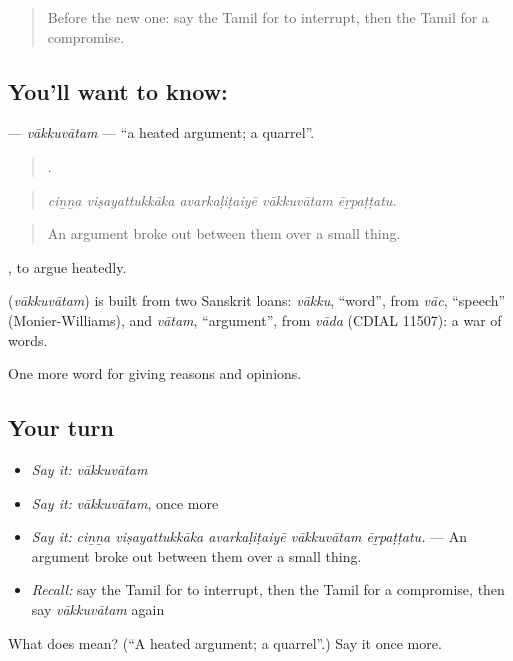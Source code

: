 \label{lesson:TA-C356-vakkuvatam}



\begin{quote}
Before the new one: say the Tamil for to interrupt, then the Tamil for a compromise.
\end{quote}

\subsection*{You'll want to know: }
\textbf{} — \emph{vākkuvātam} — \textquotedblleft{}a heated argument; a quarrel\textquotedblright{}.

\begin{quote}
    .
\end{quote}

\begin{quote}
\emph{ciṉṉa viṣayattukkāka avarkaḷiṭaiyē vākkuvātam ēṟpaṭṭatu.}
\end{quote}

\begin{quote}
An argument broke out between them over a small thing.
\end{quote}

 , to argue heatedly.

\begin{cousinweb}
\textbf{} (\emph{vākkuvātam}) is built from two Sanskrit loans: \emph{vākku}, \textquotedblleft{}word\textquotedblright{}, from \emph{vāc}, \textquotedblleft{}speech\textquotedblright{} (Monier-Williams), and \emph{vātam}, \textquotedblleft{}argument\textquotedblright{}, from \emph{vāda} (CDIAL 11507): a war of words.
\end{cousinweb}

\begin{grammarlens}[title={What you've built}]
One more word for giving reasons and opinions.
\end{grammarlens}

\subsection*{Your turn}
\begin{itemize}
\raggedright
  \item \emph{Say it:} \emph{vākkuvātam}
  \item \emph{Say it:} \emph{vākkuvātam}, once more
  \item \emph{Say it:} \emph{ciṉṉa viṣayattukkāka avarkaḷiṭaiyē vākkuvātam ēṟpaṭṭatu.} — An argument broke out between them over a small thing.
  \item \emph{Recall:} say the Tamil for to interrupt, then the Tamil for a compromise, then say \emph{vākkuvātam} again
\end{itemize}

\begin{tcolorbox}[breakable,colback=teal!4,colframe=teal!35!black,title={Before you move on}]
What does  mean? (\textquotedblleft{}A heated argument; a quarrel\textquotedblright{}.) Say it once more.
\end{tcolorbox}
